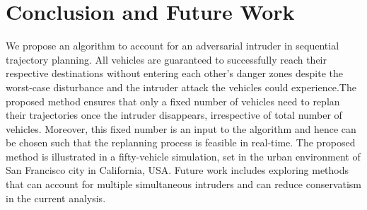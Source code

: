 \section{Conclusion and Future Work}
We propose an algorithm to account for an adversarial intruder in sequential trajectory planning. All vehicles are guaranteed to successfully reach their respective destinations without entering each other's danger zones despite the worst-case disturbance and the intruder attack the vehicles could experience.The proposed method ensures that only a fixed number of vehicles need to replan their trajectories once the intruder disappears, irrespective of total number of vehicles. Moreover, this fixed number is an input to the algorithm and hence can be chosen such that the replanning process is feasible in real-time. The proposed method is illustrated in a fifty-vehicle simulation, set in the urban environment of San Francisco city in California, USA. Future work includes exploring methods that can account for multiple simultaneous intruders and can reduce conservatism in the current analysis.